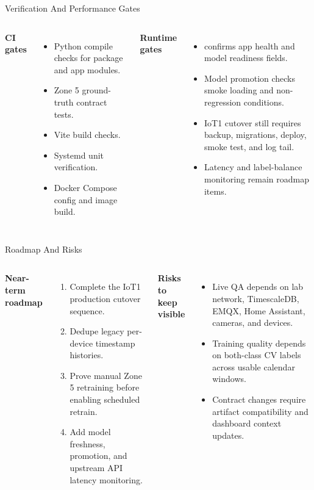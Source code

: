 \documentclass[aspectratio=169]{beamer}
\newcommand{\code}[1]{{\ttfamily\detokenize{#1}}}
\begin{document}
\begin{frame}{Verification And Performance Gates}
\begin{columns}[T,onlytextwidth]
\textbf{CI gates}
\begin{itemize}
  \item Python compile checks for package and app modules.
  \item Zone 5 ground-truth contract tests.
  \item Vite build checks.
  \item Systemd unit verification.
  \item Docker Compose config and image build.
\end{itemize}

\textbf{Runtime gates}
\begin{itemize}
  \item \code{/api/health} confirms app health and model readiness fields.
  \item Model promotion checks smoke loading and non-regression conditions.
  \item IoT1 cutover still requires backup, migrations, deploy, smoke test, and log tail.
  \item Latency and label-balance monitoring remain roadmap items.
\end{itemize}
\end{columns}
\end{frame}

\begin{frame}{Roadmap And Risks}
\begin{columns}[T,onlytextwidth]
\textbf{Near-term roadmap}
\begin{enumerate}
  \item Complete the IoT1 production cutover sequence.
  \item Dedupe legacy per-device timestamp histories.
  \item Prove manual Zone 5 retraining before enabling scheduled retrain.
  \item Add model freshness, promotion, and upstream API latency monitoring.
\end{enumerate}

\textbf{Risks to keep visible}
\begin{itemize}
  \item Live QA depends on lab network, TimescaleDB, EMQX, Home Assistant, cameras, and devices.
  \item Training quality depends on both-class CV labels across usable calendar windows.
  \item Contract changes require artifact compatibility and dashboard context updates.
\end{itemize}
\end{columns}
\end{frame}
\end{document}
